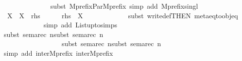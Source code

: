 \begin{isabellebody}
\ \ \ \ \ \ \ \ \ \ \ \ \ \isamarkupfalse%
{\isacharparenleft}{\kern0pt}subst\ Mprefix{\isacharunderscore}{\kern0pt}Par{\isacharunderscore}{\kern0pt}Mprefix{\isacharcomma}{\kern0pt}\ simp\ add{\isacharcolon}{\kern0pt}\ Mprefix{\isacharunderscore}{\kern0pt}singl{\isacharparenright}{\kern0pt}\ %
\isanewline
\ \ \isamarkupfalse%
\ X\ \ {\isachardoublequoteopen}X\ {\isacharequal}{\kern0pt}\ {\isacharquery}{\kern0pt}rhs{\isacharprime}{\kern0pt}{\isachardoublequoteclose}\isanewline
\ \ \isamarkupfalse%
\ {\isacharasterisk}{\kern0pt}{\isacharasterisk}{\kern0pt}\ {\isacharcolon}{\kern0pt}\ {\isachardoublequoteopen}{\isacharquery}{\kern0pt}rhs\ {\isacharequal}{\kern0pt}\ X{\isachardoublequoteclose}\ \isanewline
\ \ \ \ \ \ \ \ \ \ \ \isamarkupfalse%
{\isacharparenleft}{\kern0pt}subst\ write{}{\isacharunderscore}{\kern0pt}def{\isacharbrackleft}{\kern0pt}THEN\ meta{\isacharunderscore}{\kern0pt}eq{\isacharunderscore}{\kern0pt}to{\isacharunderscore}{\kern0pt}obj{\isacharunderscore}{\kern0pt}eq{\isacharbrackright}{\kern0pt}{\isacharparenright}{\kern0pt}\isanewline
\ \ \ \ \ \ \ \ \ \ \ \isamarkupfalse%
{\isacharparenleft}{\kern0pt}simp\ add{\isacharcolon}{\kern0pt}\ List{\isachardot}{\kern0pt}upto{\isachardot}{\kern0pt}simps{\isacharparenright}{\kern0pt}\ \ \isanewline
\ \ \ \ \ \ \ \ \ \ \ \isamarkupfalse%
{\isacharparenleft}{\kern0pt}subst\ sema{\isacharunderscore}{\kern0pt}rec{\isacharbrackleft}{\kern0pt}\ n{\isacharequal}{\kern0pt}{\isacartoucheopen}{}{\isacartoucheclose}{\isacharbrackright}{\kern0pt}{\isacharcomma}{\kern0pt}subst\ sema{\isacharunderscore}{\kern0pt}rec{\isacharbrackleft}{\kern0pt}\ n{\isacharequal}{\kern0pt}{\isacartoucheopen}{}{\isacartoucheclose}{\isacharbrackright}{\kern0pt}{\isacharcomma}{\kern0pt}\isanewline
\ \ \ \ \ \ \ \ \ \ \ \ \ \ \ \ \ subst\ sema{\isacharunderscore}{\kern0pt}rec{\isacharbrackleft}{\kern0pt}\ n{\isacharequal}{\kern0pt}{\isacartoucheopen}{}{\isacartoucheclose}{\isacharbrackright}{\kern0pt}{\isacharcomma}{\kern0pt}subst\ sema{\isacharunderscore}{\kern0pt}rec{\isacharbrackleft}{\kern0pt}\ n{\isacharequal}{\kern0pt}{\isacartoucheopen}{}{\isacartoucheclose}{\isacharbrackright}{\kern0pt}{\isacharparenright}{\kern0pt}\ \isanewline
\ \ \ \ \ \ \ \ \ \ \ \isamarkupfalse%
{\isacharparenleft}{\kern0pt}simp\ add{\isacharcolon}{\kern0pt}\ inter{}Mprefix{}\ inter{}Mprefix{}{\isacharparenright}{\kern0pt}\ \isanewline

\end{isabellebody}
